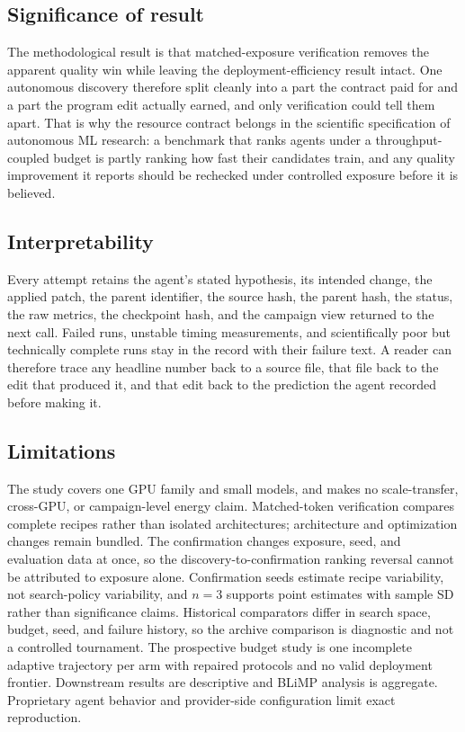 \documentclass{article}
\begin{document}
\subsection{Significance of result}
The methodological result is that matched-exposure verification removes the apparent quality win while leaving the deployment-efficiency result intact. One autonomous discovery therefore split cleanly into a part the contract paid for and a part the program edit actually earned, and only verification could tell them apart. That is why the resource contract belongs in the scientific specification of autonomous ML research: a benchmark that ranks agents under a throughput-coupled budget is partly ranking how fast their candidates train, and any quality improvement it reports should be rechecked under controlled exposure before it is believed.

\subsection{Interpretability}
Every attempt retains the agent's stated hypothesis, its intended change, the applied patch, the parent identifier, the source hash, the parent hash, the status, the raw metrics, the checkpoint hash, and the campaign view returned to the next call. Failed runs, unstable timing measurements, and scientifically poor but technically complete runs stay in the record with their failure text. A reader can therefore trace any headline number back to a source file, that file back to the edit that produced it, and that edit back to the prediction the agent recorded before making it.

\subsection{Limitations}
The study covers one GPU family and small models, and makes no scale-transfer, cross-GPU, or campaign-level energy claim. Matched-token verification compares complete recipes rather than isolated architectures; architecture and optimization changes remain bundled. The confirmation changes exposure, seed, and evaluation data at once, so the discovery-to-confirmation ranking reversal cannot be attributed to exposure alone. Confirmation seeds estimate recipe variability, not search-policy variability, and $n=3$ supports point estimates with sample SD rather than significance claims. Historical comparators differ in search space, budget, seed, and failure history, so the archive comparison is diagnostic and not a controlled tournament. The prospective budget study is one incomplete adaptive trajectory per arm with repaired protocols and no valid deployment frontier. Downstream results are descriptive and BLiMP analysis is aggregate. Proprietary agent behavior and provider-side configuration limit exact reproduction.
\label{parttwoend}
\end{document}
